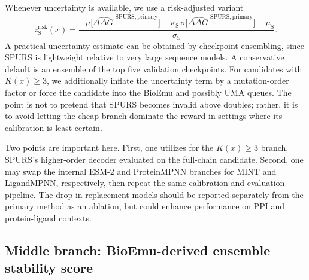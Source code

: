 \documentclass[11pt]{article}
\newcommand{\ddG}{\ensuremath{\Delta\Delta G \ }}
\begin{document}
	Whenever uncertainty is available, we use a risk-adjusted variant
	\begin{equation}
		z_{\mathrm S}^{\mathrm{risk}}(x)=\frac{-\mu\big[\widehat{\ddG}^{\mathrm{SPURS,primary}}\big]-\kappa_{\mathrm S}\,\sigma\big[\widehat{\ddG}^{\mathrm{SPURS,primary}}\big]-\mu_{\mathrm S}}{\sigma_{\mathrm S}}.
	\end{equation}
	A practical uncertainty estimate can be obtained by checkpoint ensembling, since SPURS is lightweight relative to very large sequence models. A conservative default is an ensemble of the top five validation checkpoints. For candidates with $K(x)\ge 3$, we additionally inflate the uncertainty term by a mutation-order factor or force the candidate into the BioEmu and possibly UMA queues. The point is not to pretend that SPURS becomes invalid above doubles; rather, it is to avoid letting the cheap branch dominate the reward in settings where its calibration is least certain.
	
	Two points are important here. First, one utilizes for the $K(x)\ge 3$ branch, SPURS's higher-order decoder evaluated on the full-chain candidate. Second, one may swap the internal ESM-2 and ProteinMPNN branches for MINT and LigandMPNN, respectively, then repeat the same calibration and evaluation pipeline. The drop in replacement models should be reported separately from the primary method as an ablation, but could enhance performance on PPI and protein-ligand contexts. 
	
	
	
	\subsection{Middle branch: BioEmu-derived ensemble stability score}
	
\end{document}
